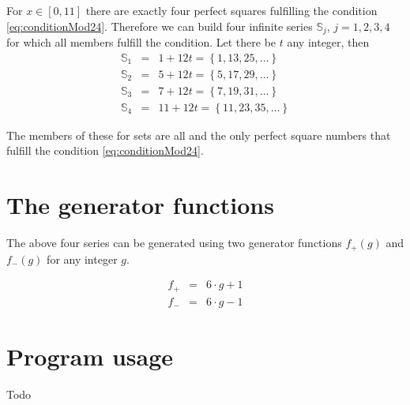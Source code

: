 \documentclass[reqno,10pt,a4paper]{article}
\begin{document}
	For $x \in [0, 11]$ there are exactly four perfect squares fulfilling the condition \eqref{eq:conditionMod24}. Therefore we can build four infinite series $\mathbb{S}_j$, $j = 1, 2, 3, 4$ for which all members fulfill the condition. Let there be $t$ any integer, then
	\begin{eqnarray}
		\mathbb{S}_1 &=& 1 + 12 t = \left\{ 1, 13, 25, \ldots \right\} \\
		\mathbb{S}_2 &=& 5 + 12 t = \left\{ 5, 17, 29, \ldots \right\} \\
		\mathbb{S}_3 &=& 7 + 12 t = \left\{ 7, 19, 31, \ldots \right\} \\
		\mathbb{S}_4 &=& 11 + 12 t = \left\{ 11, 23, 35, \ldots \right\}
	\end{eqnarray}
	
	The members of these for sets are all and the only perfect square numbers that fulfill the condition \eqref{eq:conditionMod24}.
	
	
	\section{The generator functions}
	
	The above four series can be generated using two generator functions $f_+(g)$ and $f_-(g)$ for any integer $g$.
	
	\begin{eqnarray}
		f_+ &=& 6 \cdot g + 1 \label{eq:generatorFunctionPlus} \\
		f_- &=& 6 \cdot g - 1 \label{eq:generatorFunctionMinus}
	\end{eqnarray}
	
	
	\section{Program usage}
	
	Todo
	
	
	
\end{document}
